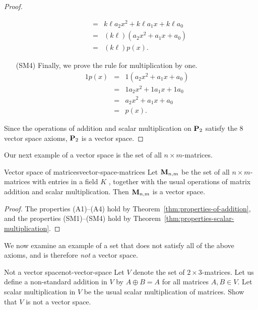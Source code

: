 \begin{proof}
\begin{itemize}
\begin{eqnarray*}
               &=&  k\ell a_2x^2 + k\ell a_1x + k\ell a_0 \\
               &=& (k\ell) (a_2x^2 + a_1x + a_0)\\
               &=& (k\ell) p(x).
    \end{eqnarray*}
  \item[(SM4)] Finally, we prove the rule for multiplication by one.
    \begin{eqnarray*}
      1p(x) &=& 1 (a_2x^2 + a_1x + a_0)\\
            &=& 1a_2x^2 + 1a_1x + 1a_0\\
            &=& a_2x^2 + a_1x + a_0\\
            &=& p(x).
    \end{eqnarray*}
  \end{itemize}
  Since the operations of addition and scalar multiplication on
  $\mathbf{P}_2$ satisfy the $8$ vector space axioms, $\mathbf{P}_2$ is a vector
  space.
\end{proof}

Our next example of a vector space is the set of all
$n\times m$-matrices.

\begin{example}{Vector space of matrices}{vector-space-matrices}
  Let $\mathbf{M}_{n,m}$%
   be the set of all $n\times m$-matrices
  with entries in a field $K$%
  , together with the usual operations
  of matrix addition and scalar multiplication. Then $\mathbf{M}_{n,m}$ is a
  vector space.
\end{example}

\begin{proof}
  The properties (A1)--(A4) hold by
  Theorem~\ref{thm:properties-of-addition}, and the properties
  (SM1)--(SM4) hold by Theorem~\ref{thm:properties-scalar-multiplication}.
\end{proof}

We now examine an example of a set that does not satisfy all of the
above axioms, and is therefore \textit{not} a vector space.

\begin{example}{Not a vector space}{not-vector-space}
  Let $V$ denote the set of $2 \times 3$-matrices. Let us define a
  non-standard addition in $V$ by $A \oplus B = A$ for all matrices
  $A,B\in V$. Let scalar multiplication in $V$ be the usual scalar
  multiplication of matrices. Show that $V$ is not a vector space.
\end{example}

